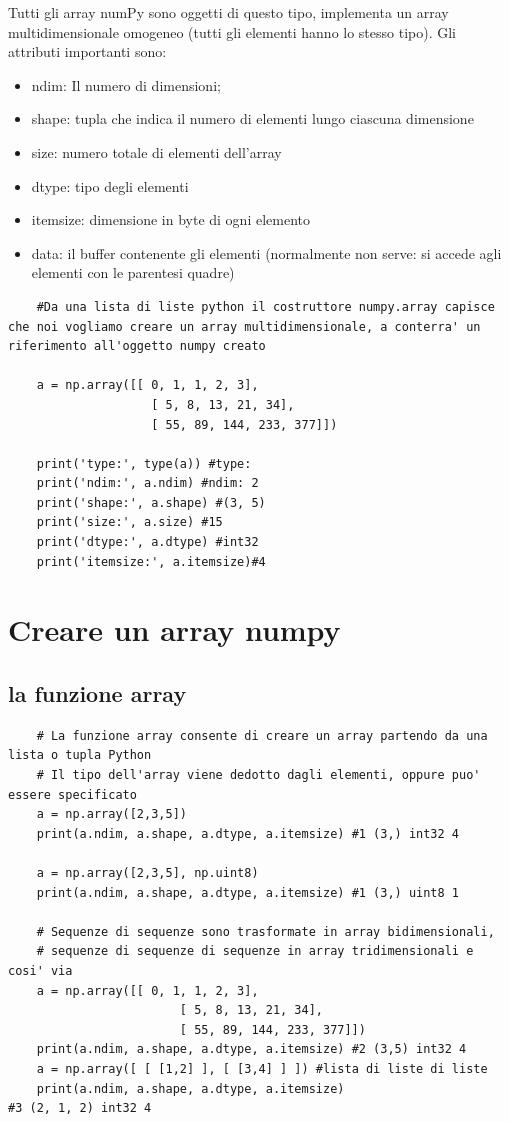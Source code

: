 Tutti gli array numPy sono oggetti di questo tipo, implementa un array multidimensionale omogeneo (tutti gli elementi hanno lo stesso tipo). Gli attributi importanti sono:
\begin{itemize}
	\item ndim: Il numero di dimensioni;
	\item shape: tupla che indica il numero di elementi lungo ciascuna dimensione
	\item size: numero totale di elementi dell'array
	\item dtype: tipo degli elementi
	\item itemsize: dimensione in byte di ogni elemento
	\item data: il buffer contenente gli elementi (normalmente non serve: si accede agli elementi con le parentesi quadre)
\end{itemize}

\begin{lstlisting}
	#Da una lista di liste python il costruttore numpy.array capisce che noi vogliamo creare un array multidimensionale, a conterra' un riferimento all'oggetto numpy creato
	
	a = np.array([[ 0, 1, 1, 2, 3],
					[ 5, 8, 13, 21, 34],
					[ 55, 89, 144, 233, 377]])

	print('type:', type(a)) #type:
	print('ndim:', a.ndim) #ndim: 2
	print('shape:', a.shape) #(3, 5)
	print('size:', a.size) #15
	print('dtype:', a.dtype) #int32
	print('itemsize:', a.itemsize)#4
\end{lstlisting}

\section{Creare un array numpy}

\subsection{la funzione array}

\begin{lstlisting}
	# La funzione array consente di creare un array partendo da una lista o tupla Python
	# Il tipo dell'array viene dedotto dagli elementi, oppure puo' essere specificato
	a = np.array([2,3,5])
	print(a.ndim, a.shape, a.dtype, a.itemsize) #1 (3,) int32 4
	
	a = np.array([2,3,5], np.uint8)
	print(a.ndim, a.shape, a.dtype, a.itemsize) #1 (3,) uint8 1
	
	# Sequenze di sequenze sono trasformate in array bidimensionali,
	# sequenze di sequenze di sequenze in array tridimensionali e cosi' via
	a = np.array([[ 0, 1, 1, 2, 3],
						[ 5, 8, 13, 21, 34],
						[ 55, 89, 144, 233, 377]])
	print(a.ndim, a.shape, a.dtype, a.itemsize) #2 (3,5) int32 4
	a = np.array([ [ [1,2] ], [ [3,4] ] ]) #lista di liste di liste 
	print(a.ndim, a.shape, a.dtype, a.itemsize)
#3 (2, 1, 2) int32 4
\end{lstlisting}

